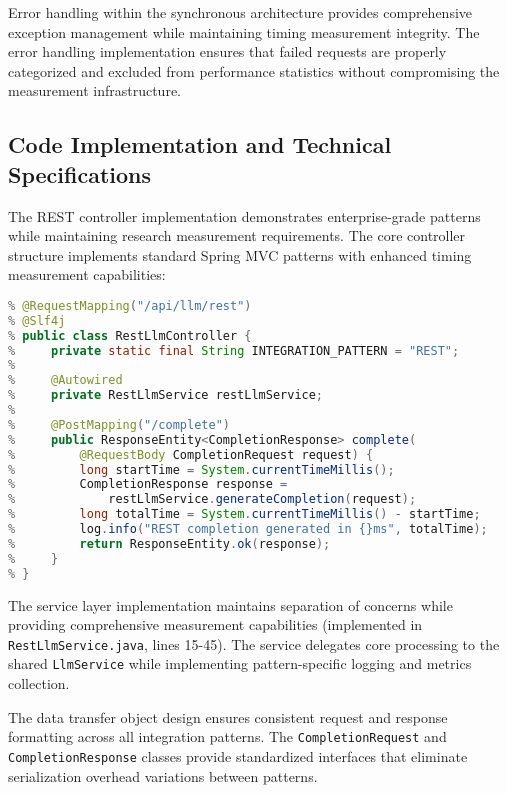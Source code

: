 
Error handling within the synchronous architecture provides comprehensive exception management while maintaining timing measurement integrity. The error handling implementation ensures that failed requests are properly categorized and excluded from performance statistics without compromising the measurement infrastructure.

\subsection{Code Implementation and Technical Specifications}

The REST controller implementation demonstrates enterprise-grade patterns while maintaining research measurement requirements. The core controller structure implements standard Spring MVC patterns with enhanced timing measurement capabilities:

\begin{lstlisting}[language=Java, caption=REST Controller Implementation Pattern]
% @RestController
% @RequestMapping("/api/llm/rest")
% @Slf4j
% public class RestLlmController {
%     private static final String INTEGRATION_PATTERN = "REST";
%     
%     @Autowired
%     private RestLlmService restLlmService;
%     
%     @PostMapping("/complete")
%     public ResponseEntity<CompletionResponse> complete(
%         @RequestBody CompletionRequest request) {
%         long startTime = System.currentTimeMillis();
%         CompletionResponse response = 
%             restLlmService.generateCompletion(request);
%         long totalTime = System.currentTimeMillis() - startTime;
%         log.info("REST completion generated in {}ms", totalTime);
%         return ResponseEntity.ok(response);
%     }
% }
\end{lstlisting}


The service layer implementation maintains separation of concerns while providing comprehensive measurement capabilities (implemented in \texttt{RestLlmService.java}, lines 15-45). The service delegates core processing to the shared \texttt{LlmService} while implementing pattern-specific logging and metrics collection.


The data transfer object design ensures consistent request and response formatting across all integration patterns. The \texttt{CompletionRequest} and \texttt{CompletionResponse} classes provide standardized interfaces that eliminate serialization overhead variations between patterns.

